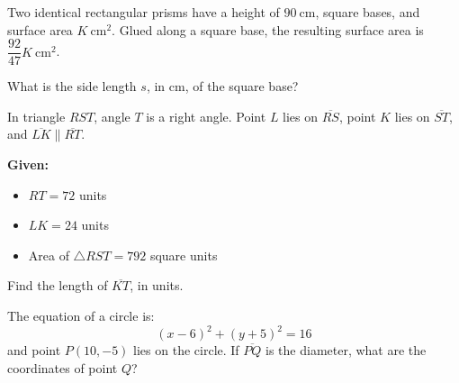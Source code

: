 
\vspace{2em}
\newpage

\noindent\markforreview
\vspace{1em}

Two identical rectangular prisms have a height of \(90\ \text{cm}\), square bases, and surface area \(K\ \text{cm}^2\). Glued along a square base, the resulting surface area is \(\dfrac{92}{47}K\ \text{cm}^2\).

What is the side length \(s\), in cm, of the square base?

\vspace{2em}
\newpage

\noindent\markforreview
\vspace{1em}

In triangle \(RST\), angle \(T\) is a right angle. Point \(L\) lies on \(\overline{RS}\), point \(K\) lies on \(\overline{ST}\), and \(\overline{LK} \parallel \overline{RT}\).

\textbf{Given:}
\begin{itemize}
\item \(RT = 72\) units
\item \(LK = 24\) units
\item Area of \(\triangle RST = 792\) square units
\end{itemize}

Find the length of \(\overline{KT}\), in units.

\vspace{2em}
\newpage

\noindent\markforreview
\vspace{1em}

The equation of a circle is:
\[
(x - 6)^2 + (y + 5)^2 = 16
\]
and point \(P(10, -5)\) lies on the circle. If \(\overline{PQ}\) is the diameter, what are the coordinates of point \(Q\)?
